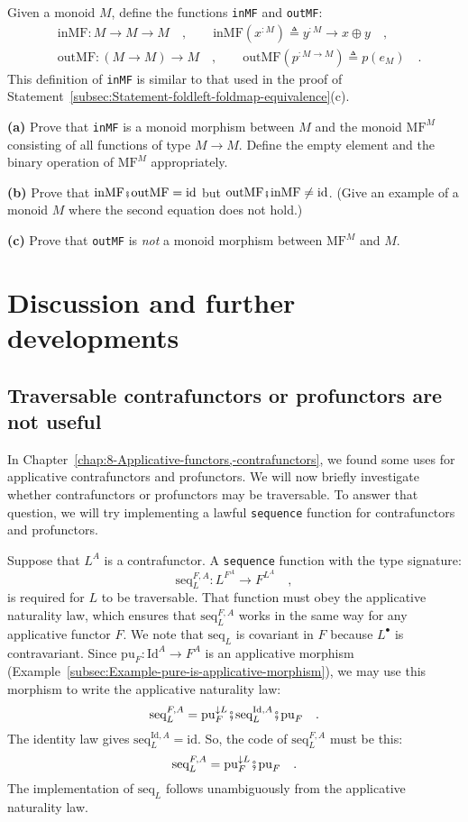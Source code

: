 Given a monoid $M$, define the functions \lstinline!inMF! and \lstinline!outMF!:
\begin{align*}
 & \text{inMF}:M\rightarrow M\rightarrow M\quad,\quad\quad\text{inMF}(x^{:M})\triangleq y^{:M}\rightarrow x\oplus y\quad,\\
 & \text{outMF}:(M\rightarrow M)\rightarrow M\quad,\quad\quad\text{outMF}(p^{:M\rightarrow M})\triangleq p(e_{M})\quad.
\end{align*}
This definition of \lstinline!inMF! is similar to that used in the
proof of Statement~\ref{subsec:Statement-foldleft-foldmap-equivalence}(c).

\textbf{(a)} Prove that \lstinline!inMF! is a monoid morphism between
$M$ and the monoid $\text{MF}^{M}$ consisting of all functions of
type $M\rightarrow M$. Define the empty element and the binary operation
of $\text{MF}^{M}$ appropriately.

\textbf{(b)} Prove that $\text{inMF}\bef\text{outMF}=\text{id}$ but
$\text{outMF}\bef\text{inMF}\neq\text{id}$. (Give an example of a
monoid $M$ where the second equation does not hold.)

\textbf{(c)} Prove that \lstinline!outMF! is \emph{not} a monoid
morphism between $\text{MF}^{M}$ and $M$.

\section{Discussion and further developments}

\subsection{Traversable contrafunctors or profunctors are not useful}

In Chapter~\ref{chap:8-Applicative-functors,-contrafunctors}, we
found some uses for applicative contrafunctors and profunctors. We
will now briefly investigate whether contrafunctors or profunctors
may be traversable. To answer that question, we will try implementing
a lawful \lstinline!sequence! function for contrafunctors and profunctors.

Suppose that $L^{A}$ is a contrafunctor. A \lstinline!sequence!
function with the type signature:
\[
\text{seq}_{L}^{F,A}:L^{F^{A}}\rightarrow F^{L^{A}}\quad,
\]
is required for $L$ to be traversable. That function must obey the
applicative naturality law, which ensures that $\text{seq}_{L}^{F,A}$
works in the same way for any applicative functor $F$. We note that
$\text{seq}_{L}$ is covariant in $F$ because $L^{\bullet}$ is contravariant.
Since $\text{pu}_{F}:\text{Id}^{A}\rightarrow F^{A}$ is an applicative
morphism (Example~\ref{subsec:Example-pure-is-applicative-morphism}),
we may use this morphism to write the applicative naturality law:
\[
\text{seq}_{L}^{F,A}=\text{pu}_{F}^{\downarrow L}\bef\text{seq}_{L}^{\text{Id},A}\bef\text{pu}_{F}\quad.
\]
The identity law gives $\text{seq}_{L}^{\text{Id},A}=\text{id}$.
So, the code of $\text{seq}_{L}^{F,A}$ must be this:
\[
\text{seq}_{L}^{F,A}=\text{pu}_{F}^{\downarrow L}\bef\text{pu}_{F}\quad.
\]
The implementation of $\text{seq}_{L}$ follows unambiguously from
the applicative naturality law.

